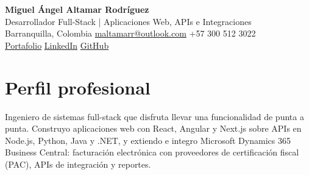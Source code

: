 \documentclass[10pt]{article}
\begin{document}
\begin{center}
  {\LARGE\bfseries Miguel Ángel Altamar Rodríguez}\\[0.3em]
  {\large Desarrollador Full-Stack | Aplicaciones Web, APIs e Integraciones}\\[0.4em]
  Barranquilla, Colombia \enspace\textbullet\enspace
  \href{mailto:maltamarr@outlook.com}{maltamarr@outlook.com} \enspace\textbullet\enspace
  +57 300 512 3022\\[0.15em]
  \href{https://migueiangel.github.io/portfolio/es/}{Portafolio} \enspace\textbullet\enspace
  \href{https://www.linkedin.com/in/mangel2002/}{LinkedIn} \enspace\textbullet\enspace
  \href{https://github.com/MigueIAngel}{GitHub}
\end{center}
\vspace{0.1em}

\section*{Perfil profesional}
Ingeniero de sistemas full-stack que disfruta llevar una funcionalidad de punta a punta. Construyo aplicaciones web con React, Angular y Next.js sobre APIs en Node.js, Python, Java y .NET, y extiendo e integro Microsoft Dynamics 365 Business Central: facturación electrónica con proveedores de certificación fiscal (PAC), APIs de integración y reportes.
\end{document}
